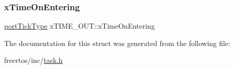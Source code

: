 \subsubsection{\texorpdfstring{x\+Time\+On\+Entering}{xTimeOnEntering}}
{\footnotesize\ttfamily \mbox{\hyperlink{portmacro_8h_a4d746b2ff8fafc490b764c66411ec457}{port\+Tick\+Type}} x\+T\+I\+M\+E\+\_\+\+O\+U\+T\+::x\+Time\+On\+Entering}



The documentation for this struct was generated from the following file\+:\begin{DoxyCompactItemize}
\item 
freertos/inc/\mbox{\hyperlink{task_8h}{task.\+h}}\end{DoxyCompactItemize}
